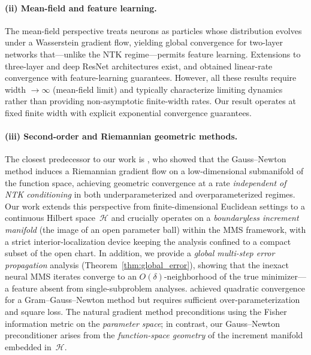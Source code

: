 \documentclass[twoside,11pt]{article}
\newcommand{\calH}{\mathcal{H}}
\begin{document}
{%
\paragraph{(ii) Mean-field and feature learning.}
The mean-field perspective \citep{mei2018mean,mei2019mean} treats neurons as particles whose distribution evolves under a Wasserstein gradient flow, yielding global convergence for two-layer networks that---unlike the NTK regime---permits feature learning.
Extensions to three-layer \citep{pham2021global,nguyen2020rigorous} and deep ResNet \citep{lu2020mean} architectures exist, and
\citet{chen2022feature} obtained linear-rate convergence with feature-learning guarantees.
However, all these results require width $\to\infty$ (mean-field limit) and typically characterize limiting dynamics rather than providing non-asymptotic finite-width rates.
Our result operates at fixed finite width with explicit exponential convergence guarantees.

\paragraph{(iii) Second-order and Riemannian geometric methods.}
The closest predecessor to our work is \citet{cayci2025riemannian}, who showed that the Gauss--Newton method induces a Riemannian gradient flow on a low-dimensional submanifold of the function space, achieving geometric convergence at a rate \emph{independent of NTK conditioning} in both underparameterized and overparameterized regimes.
Our work extends this perspective from finite-dimensional Euclidean settings to a continuous Hilbert space~$\calH$ and crucially operates on a \emph{boundaryless increment manifold} (the image of an open parameter ball) within the MMS framework, with a strict interior-localization device keeping the analysis confined to a compact subset of the open chart.
In addition, we provide a \emph{global multi-step error propagation} analysis (Theorem~\ref{thm:global_error}), showing that the inexact neural MMS iterates converge to an $O(\delta)$-neighborhood of the true minimizer---a feature absent from single-subproblem analyses.
\citet{cai2019gram} achieved quadratic convergence for a Gram--Gauss--Newton method but requires sufficient over-parameterization and square loss.
The natural gradient method \citep{amari1998natural,zhang2019fast} preconditions using the Fisher information metric on the \emph{parameter space};
in contrast, our Gauss--Newton preconditioner arises from the \emph{function-space geometry} of the increment manifold embedded in~$\calH$.

}
\end{document}
